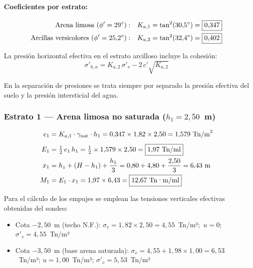 \paragraph{Coeficientes por estrato:}
\begin{align*}
  \text{Arena limosa } (\phi' = 29^\circ): &\quad
    K_{a,1} = \tan^2(30{,}5^\circ) = \boxed{0{,}347} \\
  \text{Arcillas versicolores } (\phi' = 25{,}2^\circ): &\quad
    K_{a,2} = \tan^2(32{,}4^\circ) = \boxed{0{,}402}
\end{align*}

La presión horizontal efectiva en el estrato arcilloso incluye la cohesión:
\begin{equation}
  \sigma'_{h,a} = K_{a,2}\,\sigma'_v - 2\,c'\sqrt{K_{a,2}}
  \label{eq:sigma_ha_coh}
\end{equation}

En la separación de presiones se trata siempre por separado la presión efectiva
del suelo y la presión intersticial del agua.

\subsubsection{Estrato 1 — Arena limosa no saturada ($h_1 = 2{,}50$~m)}

\begin{align*}
  e_1 &= K_{a,1} \cdot \gamma_\text{nat} \cdot h_1
        = 0{,}347 \times 1{,}82 \times 2{,}50 = 1{,}579~\text{Tn/m}^2 \\[4pt]
  E_1 &= \tfrac{1}{2}\,e_1\,h_1
        = \tfrac{1}{2} \times 1{,}579 \times 2{,}50 = \boxed{1{,}97~\text{Tn/ml}} \\
  x_1 &= h_z + (H - h_1) + \frac{h_1}{3}
        = 0{,}80 + 4{,}80 + \frac{2{,}50}{3} = 6{,}43~\text{m} \\
  M_1 &= E_1 \cdot x_1 = 1{,}97 \times 6{,}43 = \boxed{12{,}67~\text{Tn·m/ml}}
\end{align*}

\begin{notabox}
  Para el cálculo de los empujes se emplean las tensiones verticales efectivas
  obtenidas del sondeo:
  \begin{itemize}
    \item Cota $-2{,}50$~m (techo N.F.):
      $\sigma_v = 1{,}82 \times 2{,}50 = 4{,}55$~Tn/m²;~$u=0$;
      $\sigma'_v = 4{,}55$~Tn/m²
    \item Cota $-3{,}50$~m (base arena saturada):
      $\sigma_v = 4{,}55 + 1{,}98 \times 1{,}00 = 6{,}53$~Tn/m²;
      $u = 1{,}00$~Tn/m²; $\sigma'_v = 5{,}53$~Tn/m²
  \end{itemize}
\end{notabox}


